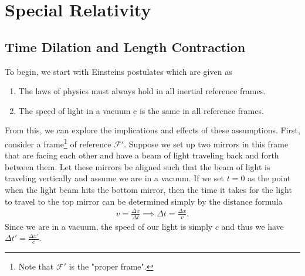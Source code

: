 \section{Special Relativity}

\subsection{Time Dilation and Length Contraction}
To begin, we start with Einsteins postulates which are given as
\begin{enumerate}
	\item The laws of physics must always hold in all inertial reference frames.
	\item The speed of light in a vacuum c is the same in all reference frames.
\end{enumerate}
From this, we can explore the implications and effects of these assumptions. First, consider a frame\footnote{Note that $\mathcal{F}'$ is the "proper frame".} of reference $\mathcal{F}'$. Suppose we set up two mirrors in this frame that are facing each other and have a beam of light traveling back and forth between them. Let these mirrors be aligned such that the beam of light is traveling vertically and assume we are in a vacuum. If we set $t=0$ as the point when the light beam hits the bottom mirror, then the time it takes for the light to travel to the top mirror can be determined simply by the distance formula \begin{align}
	v=\frac{\Delta x}{\Delta t} \implies \Delta t = \frac{\Delta x}{v}. \label{v=d/t}
\end{align} 
Since we are in a vacuum, the speed of our light is simply $c$ and thus we have $\Delta t' = \frac{\Delta x'}{c}$. 


